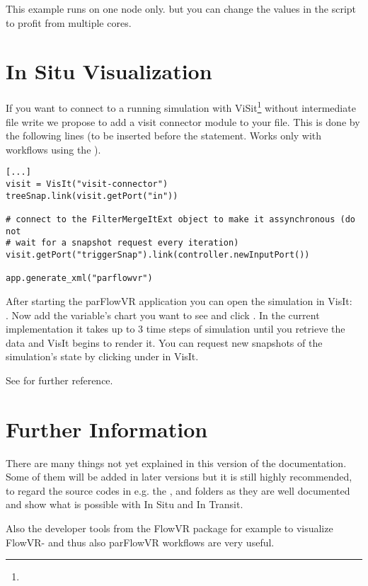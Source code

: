 This example runs on one node only. but you can change the  values in the 
script to profit from multiple cores.

\section{In Situ Visualization}
If you want to connect to a running simulation with ViSit\footnote{}
without intermediate file write
we propose to add a visit connector module to your  file.
This is done by the following lines (to be inserted before the
 statement. Works only with workflows using the ).
\begin{display}\begin{verbatim}
[...]
visit = VisIt("visit-connector")
treeSnap.link(visit.getPort("in"))

# connect to the FilterMergeItExt object to make it assynchronous (do not
# wait for a snapshot request every iteration)
visit.getPort("triggerSnap").link(controller.newInputPort())

app.generate_xml("parflowvr")
\end{verbatim}\end{display}
After starting the parFlowVR application you can open the simulation in VisIt:\\
. Now add the variable's
chart you want to see and click . In the current implementation it takes up to 3 time steps of
simulation until you retrieve the data and VisIt begins
to render it. You can request new snapshots of the simulation's state by clicking
 under  in VisIt.

See  for further reference.

\section{Further Information}
There are many things not yet explained in this version of the documentation.
Some of them
will be added in later versions but it is still highly recommended, to regard the source codes in e.g.
the  , 
and  folders as they are well documented and show what is possible with In Situ and In Transit.

Also the developer tools from the FlowVR package for example  to
visualize FlowVR- and thus also parFlowVR workflows are very useful.
